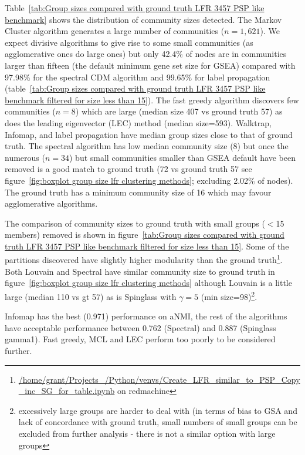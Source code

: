 Table~\ref{tab:Group sizes compared with ground truth LFR 3457 PSP like benchmark} shows the distribution of community sizes detected.
 The Markov Cluster algorithm generates a large number of communities ($n=1,621$). We expect divisive algorithms to give rise to some small communities (as agglomerative ones do large ones) but only 42.4\% of nodes are in communities larger than fifteen (the default minimum gene set size for GSEA) compared with 97.98\% for the spectral CDM algorithm and 99.65\% for label propagation (table~\ref{tab:Group sizes compared with ground truth LFR 3457 PSP like benchmark filtered for size less than 15}). The fast greedy algorithm discovers few communities ($n=8$) which are large (median size 407 vs ground truth 57) as does the leading eigenvector (LEC) method (median size=593). Walktrap, Infomap, and label propagation have median group sizes close to that of ground truth. The spectral algorithm has low median community size (8) but once the numerous ($n=34$) but small communities smaller than GSEA default have been removed is a good match to ground truth  (72 vs ground truth 57 see figure~\ref{fig:boxplot group size lfr clustering methods}; excluding 2.02\% of nodes). The ground truth has a minimum community size of 16 which may favour agglomerative algorithms. 

The comparison of community sizes to ground truth with small groups ($<$15 members) removed is shown in figure~\ref{tab:Group sizes compared with ground truth LFR 3457 PSP like benchmark filtered for size less than 15}. Some of the partitions discovered have slightly higher modularity than the ground truth\footnote{\url{/home/grant/Projects_/Python/venvs/Create_LFR_similar_to_PSP_Copy_inc_SG_for_table.ipynb} on redmachine}\cite{fortunato2016community}. Both Louvain and Spectral have similar community size to ground truth in figure~\ref{fig:boxplot group size lfr clustering methods} although Louvain is a little large (median 110 vs gt 57) as is Spinglass with $\gamma=5$ (min size=98)\footnote{excessively large groups are harder to deal with (in terms of bias to GSA and lack of concordance with ground truth, small numbers of small groups can be excluded from further analysis - there is not a similar option with large groups}.

Infomap has the best (0.971) performance on aNMI, the rest of the algorithms have acceptable performance between 0.762 (Spectral) and 0.887 (Spinglass gamma1). Fast greedy, MCL and LEC perform too poorly to be considered further. 



